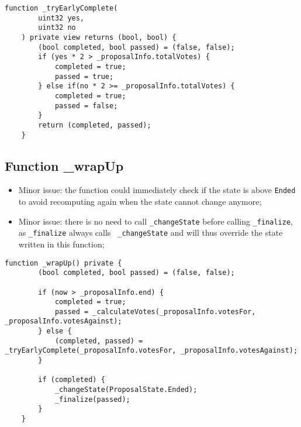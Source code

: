 \begin{lstlisting}[firstnumber=101]
    function _tryEarlyComplete(
        uint32 yes,
        uint32 no
    ) private view returns (bool, bool) {
        (bool completed, bool passed) = (false, false);
        if (yes * 2 > _proposalInfo.totalVotes) {
            completed = true;
            passed = true;
        } else if(no * 2 >= _proposalInfo.totalVotes) {
            completed = true;
            passed = false;
        }
        return (completed, passed);
    }
\end{lstlisting}

\subsection{Function \_{}wrapUp}

\begin{itemize}
\item Minor issue: the function could immediately check if the state
  is above {\tt Ended} to avoid recomputing again when the state
  cannot change anymore;
\item Minor issue: there is no need to call {\tt \_changeState} before
  calling {\tt \_finalize}, as {\tt \_finalize} always calls {\tt
    \_changeState} and will thus override the state written in this
  function;
\end{itemize}

\begin{lstlisting}[firstnumber=116]
    function _wrapUp() private {
        (bool completed, bool passed) = (false, false);

        if (now > _proposalInfo.end) {
            completed = true;
            passed = _calculateVotes(_proposalInfo.votesFor, _proposalInfo.votesAgainst);
        } else {
            (completed, passed) = _tryEarlyComplete(_proposalInfo.votesFor, _proposalInfo.votesAgainst);
        }

        if (completed) {
            _changeState(ProposalState.Ended);
            _finalize(passed);
        }
    }
\end{lstlisting}
